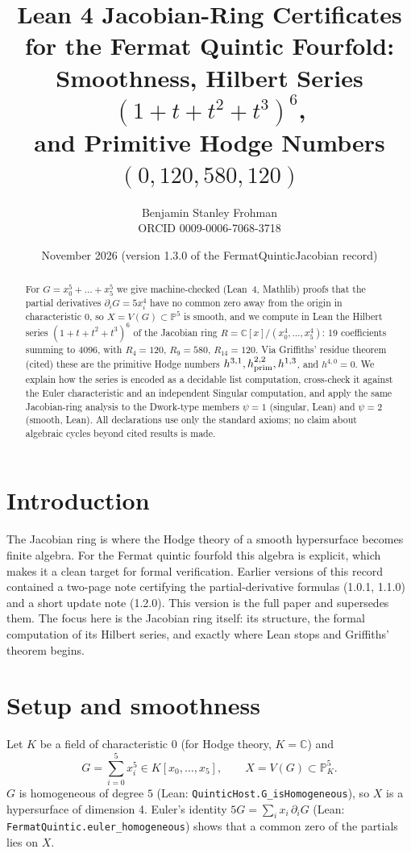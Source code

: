\documentclass[11pt]{article}
\title{Lean 4 Jacobian-Ring Certificates for the Fermat Quintic Fourfold:\\ Smoothness, Hilbert Series $(1+t+t^2+t^3)^6$,\\ and Primitive Hodge Numbers $(0,120,580,120)$}
\author{Benjamin Stanley Frohman\\ \small ORCID 0009-0006-7068-3718}
\date{November 2026 (version 1.3.0 of the FermatQuinticJacobian record)}
\theoremstyle{definition}\newtheorem{definition}[theorem]{Definition}\newtheorem{remark}[theorem]{Remark}
\newcommand{\PP}{\mathbb{P}}\newcommand{\CC}{\mathbb{C}}\newcommand{\QQ}{\mathbb{Q}}
\begin{document}
\maketitle
{}\par

\begin{abstract}
For $G=x_0^5+\dots+x_5^5$ we give machine-checked (Lean~4, Mathlib) proofs that the partial derivatives
$\partial_iG=5x_i^4$ have no common zero away from the origin in characteristic $0$, so $X=V(G)\subset\PP^5$ is
smooth, and we compute in Lean the Hilbert series $(1+t+t^2+t^3)^6$ of the Jacobian ring
$R=\CC[x]/(x_0^4,\dots,x_5^4)$: 19 coefficients summing to 4096, with $R_4=120$, $R_9=580$, $R_{14}=120$.
Via Griffiths' residue theorem (cited) these are the primitive Hodge numbers $h^{3,1},h^{2,2}_{\rm prim},h^{1,3}$,
and $h^{4,0}=0$. We explain how the series is encoded as a decidable list computation, cross-check it against
the Euler characteristic and an independent Singular computation, and apply the same Jacobian-ring analysis
to the Dwork-type members $\psi=1$ (singular, Lean) and $\psi=2$ (smooth, Lean). All declarations use only the
standard axioms; no claim about algebraic cycles beyond cited results is made.
\end{abstract}
\tableofcontents
\section{Introduction}
The Jacobian ring is where the Hodge theory of a smooth hypersurface becomes finite algebra. For the Fermat
quintic fourfold this algebra is explicit, which makes it a clean target for formal verification. Earlier
versions of this record contained a two-page note certifying the partial-derivative formulas (1.0.1, 1.1.0) and
a short update note (1.2.0). This version is the full paper and supersedes them. The focus here is the
Jacobian ring itself: its structure, the formal computation of its Hilbert series, and exactly where Lean
stops and Griffiths' theorem begins.
\section{Setup and smoothness}\label{sec:setup}
Let $K$ be a field of characteristic $0$ (for Hodge theory, $K=\CC$) and
\[ G=\sum_{i=0}^5 x_i^5\in K[x_0,\dots,x_5],\qquad X=V(G)\subset\PP^5_K. \]
$G$ is homogeneous of degree $5$ (Lean: \texttt{QuinticHost.G\_isHomogeneous}), so $X$ is a hypersurface
of dimension 4. Euler's identity $5G=\sum_i x_i\,\partial_iG$ (Lean: \texttt{FermatQuintic.euler\_homogeneous})
shows that a common zero of the partials lies on $X$.
\end{document}

